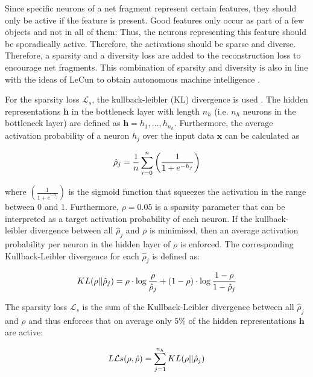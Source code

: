 Since specific neurons of a net fragment represent certain features, they should only be active if the feature is present.
Good features only occur as part of a few objects and not in all of them: Thus, the neurons representing this feature should be sporadically active. Therefore, the activations should be sparse and diverse.
Therefore, a sparsity and a diversity loss are added to the reconstruction loss to encourage net fragments.
This combination of sparsity and diversity is also in line with the ideas of LeCun to obtain autonomous machine intelligence .


For the sparsity loss $\mathcal{L}_{s}$, the kullback-leibler (KL) divergence is used .
The hidden representations $\boldsymbol{h}$ in the bottleneck layer with length $n_h$ (i.e. $n_h$ neurons in the bottleneck layer) are defined as $\boldsymbol{h} = h_1, ..., h_{n_h}$.
Furthermore, the average activation probability of a neuron $h_j$ over the input data $\boldsymbol{x}$ can be calculated as

\begin{equation}\eqlbl{ae_kldd}
		\hat{\rho}_j = \frac{1}{n} \sum^n_{i=0} \left( \frac{1}{1+e^{-h_j}} \right)
\end{equation}

where $\left( \frac{1}{1+e^{-h_j}} \right)$ is the sigmoid function that squeezes the activation in the range between $0$ and $1$. Furthermore, $\rho=0.05$ is a sparsity parameter that can be interpreted as a target activation probability of each neuron. If the kullback-leibler divergence between all $\hat{\rho}_j$ and $\rho$ is minimised, then an average activation probability per neuron in the hidden layer of $\rho$ is enforced. The corresponding Kullback-Leibler divergence for each $\hat{\rho}_j$ is defined as:

\begin{equation}\eqlbl{ae_kld}
		KL(\rho || \hat{\rho}_j) = \rho \cdot \log \frac{\rho}{\hat{\rho}_j} + (1-\rho) \cdot \log \frac{1-\rho}{1-\hat{\rho}_j}
\end{equation}

The sparsity loss $\mathcal{L}_{s}$ is the sum of the Kullback-Leibler divergence between all $\hat{\rho}_j$ and $\rho$ and thus enforces that on average only $5\%$ of the hidden representations $\boldsymbol{h}$ are active:

\begin{equation}\eqlbl{ae_kldl}
		L\mathcal{L}{s}(\rho, \hat{\rho}) = \sum_{j=1}^{n_h} KL(\rho || \hat{\rho}_j)
\end{equation}

